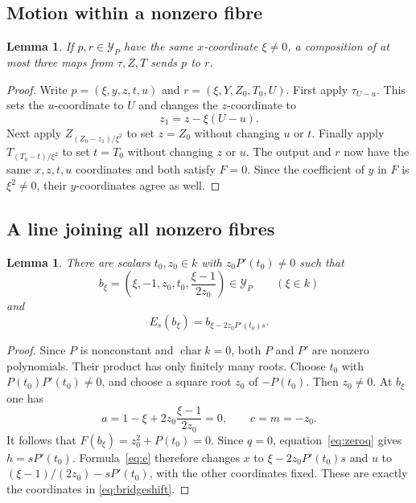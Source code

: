 \documentclass[11pt,letterpaper]{article}
\newcommand{\Y}{\mathcal Y_P}
\newtheorem{lemma}[theorem]{Lemma}
\theoremstyle{remark}
\begin{document}
\subsection{Motion within a nonzero fibre}

\begin{lemma}\label{lem:fibre}
If $p,r\in\Y$ have the same $x$-coordinate $\xi\ne0$, a composition of at most three maps from $\tau,Z,T$ sends $p$ to $r$.
\end{lemma}

\begin{proof}
Write $p=(\xi,y,z,t,u)$ and $r=(\xi,Y,Z_0,T_0,U)$. First apply $\tau_{U-u}$. This sets the $u$-coordinate to $U$ and changes the $z$-coordinate to
\[
z_1=z-\xi(U-u).
\]
Next apply $Z_{(Z_0-z_1)/\xi^2}$ to set $z=Z_0$ without changing $u$ or $t$. Finally apply $T_{(T_0-t)/\xi^2}$ to set $t=T_0$ without changing $z$ or $u$. The output and $r$ now have the same $x,z,t,u$ coordinates and both satisfy $F=0$. Since the coefficient of $y$ in $F$ is $\xi^2\ne0$, their $y$-coordinates agree as well.
\end{proof}

\subsection{A line joining all nonzero fibres}

\begin{lemma}\label{lem:bridge}
There are scalars $t_0,z_0\in k$ with $z_0P'(t_0)\ne0$ such that
\begin{equation}\label{eq:bridge}
b_\xi=\left(\xi,-1,z_0,t_0,\frac{\xi-1}{2z_0}\right)\in\Y
\qquad(\xi\in k)
\end{equation}
and
\begin{equation}\label{eq:bridgeshift}
E_s(b_\xi)=b_{\xi-2z_0P'(t_0)s}.
\end{equation}
\end{lemma}

\begin{proof}
Since $P$ is nonconstant and $\operatorname{char}k=0$, both $P$ and $P'$ are nonzero polynomials. Their product has only finitely many roots. Choose $t_0$ with $P(t_0)P'(t_0)\ne0$, and choose a square root $z_0$ of $-P(t_0)$. Then $z_0\ne0$. At $b_\xi$ one has
\[
a=1-\xi+2z_0\frac{\xi-1}{2z_0}=0,
\qquad c=m=-z_0.
\]
It follows that $F(b_\xi)=z_0^2+P(t_0)=0$. Since $q=0$, equation~\eqref{eq:zeroq} gives $h=sP'(t_0)$. Formula~\eqref{eq:e} therefore changes $x$ to $\xi-2z_0P'(t_0)s$ and $u$ to $(\xi-1)/(2z_0)-sP'(t_0)$, with the other coordinates fixed. These are exactly the coordinates in \eqref{eq:bridgeshift}.
\end{proof}
\end{document}
